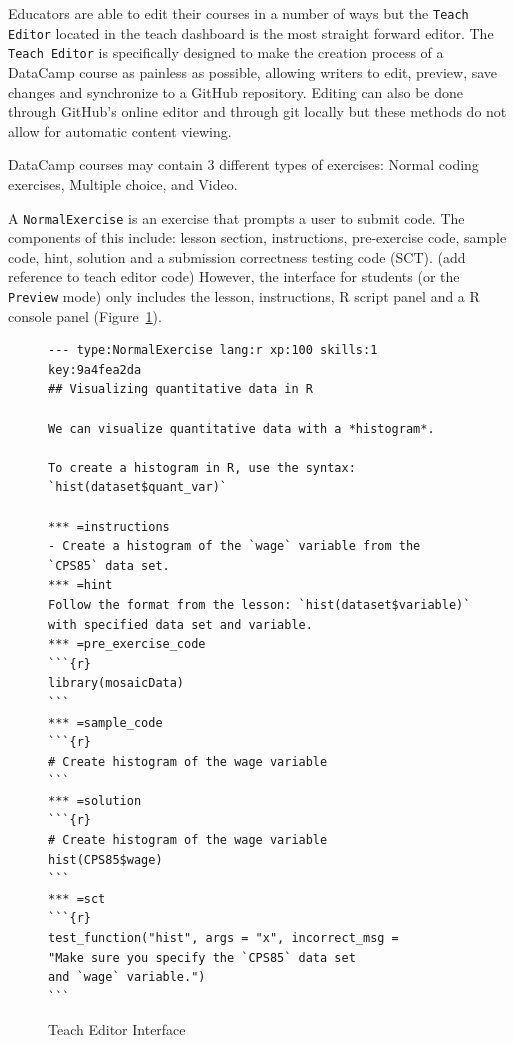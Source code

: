 \documentclass[12pt]{article}
\begin{document}
Educators are able to edit their courses in a number of ways but the \texttt{Teach Editor} located in the teach dashboard is the
most straight forward editor. The \texttt{Teach Editor} is specifically designed to make the creation process of a DataCamp course
as painless as possible, allowing writers to edit, preview, save changes and synchronize to a GitHub repository. Editing can
also be done through GitHub's online editor and through git locally but these methods do not allow for automatic content
viewing.

DataCamp courses may contain 3 different types of exercises: Normal coding exercises, Multiple choice, and Video.

A \texttt{NormalExercise} is an exercise that prompts a user to submit code. The components of this include: lesson section, instructions, pre-exercise code, sample code, hint, solution and a submission correctness testing code (SCT). (add reference to teach editor code) However, the interface for students (or the \texttt{Preview}
mode) only includes the lesson, instructions, R script panel and a R console panel (Figure~\ref{fig:code1}).


\begin{figure}
\caption{Teach Editor Interface}
\begin{verbatim}
--- type:NormalExercise lang:r xp:100 skills:1 key:9a4fea2da
## Visualizing quantitative data in R

We can visualize quantitative data with a *histogram*.

To create a histogram in R, use the syntax:
`hist(dataset$quant_var)`

*** =instructions
- Create a histogram of the `wage` variable from the 
`CPS85` data set.
*** =hint
Follow the format from the lesson: `hist(dataset$variable)`
with specified data set and variable.
*** =pre_exercise_code
```{r}
library(mosaicData)
```
*** =sample_code
```{r}
# Create histogram of the wage variable
```
*** =solution
```{r}
# Create histogram of the wage variable 
hist(CPS85$wage)
```
*** =sct
```{r}
test_function("hist", args = "x", incorrect_msg = 
"Make sure you specify the `CPS85` data set
and `wage` variable.")
```

\end{verbatim}
\label{fig:code1}
\end{figure}
\end{document}
